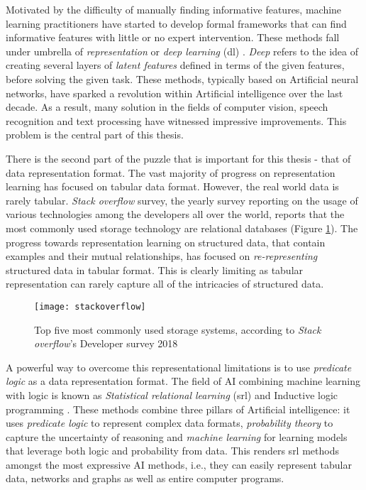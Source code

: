 Motivated by the difficulty of manually finding informative features, machine learning practitioners have started to develop formal frameworks that can find informative features with little or no expert intervention.
These methods fall under umbrella of \textit{representation} or \textit{deep learning} (\gls{dl}) \cite{Goodfellow2016, Bengio:2009}.
\textit{Deep} refers to the idea of creating several layers of \textit{latent features} defined in terms of the given features, before solving the given task.
These methods, typically based on Artificial neural networks, have sparked a revolution within Artificial intelligence over the last decade.
As a result, many solution in the fields of computer vision, speech recognition and text processing have witnessed impressive improvements.
This problem is the central part of this thesis.



There is the second part of the puzzle that is important for this thesis - that of data representation format.
The vast majority of progress on representation learning has focused on tabular data format.
However, the real world data is rarely tabular.
\textit{Stack overflow} survey, the yearly survey reporting on the usage of  various technologies among the developers all over the world, reports that the most commonly used storage technology are relational databases (Figure \ref{fig:stackoverflow}).
The progress towards representation learning on structured data, that contain examples and their mutual relationships, has focused on \textit{re-representing} structured data in tabular format.
This is clearly limiting as tabular representation can rarely capture all of the intricacies of structured data.


\begin{figure}
	\medskip
	\centering
	\texttt{[image: stackoverflow]}
	\caption[Usage of the storage technologies]{Top five most commonly used storage systems, according to \textit{Stack overflow}'s Developer survey 2018\label{fig:stackoverflow}}
\end{figure}


A powerful way to overcome this representational limitations is to use \textit{predicate logic} as a data representation format.
The field of AI combining machine learning with logic is known as \textit{Statistical relational learning} (\gls{srl}) \cite{GetoorSRL,Raedt:2016:SRA:3027718} and Inductive logic programming \cite{LucRLbook}.
These methods combine three pillars of Artificial intelligence: it uses \textit{predicate logic} to represent complex data formats, \textit{probability theory} to capture the uncertainty of reasoning and \textit{machine learning} for learning models that leverage both logic and probability from data.
This renders \gls{srl} methods amongst the most expressive AI methods, i.e., they can easily represent tabular data, networks and graphs as well as entire computer programs.



